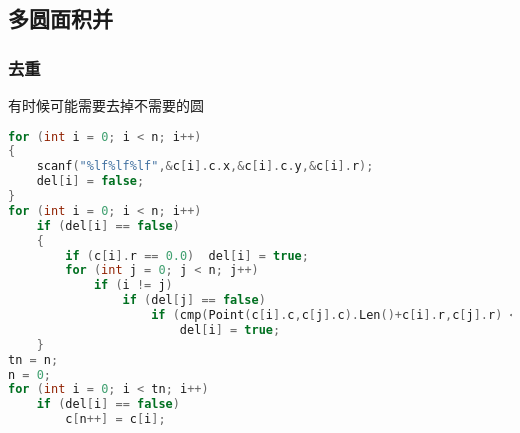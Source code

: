 \subsection{多圆面积并}
	\subsubsection{去重}
	有时候可能需要去掉不需要的圆
	\begin{lstlisting}[language=c++]
for (int i = 0; i < n; i++)
{
	scanf("%lf%lf%lf",&c[i].c.x,&c[i].c.y,&c[i].r);
	del[i] = false;
}
for (int i = 0; i < n; i++)
	if (del[i] == false)
	{
		if (c[i].r == 0.0)  del[i] = true;
		for (int j = 0; j < n; j++)
			if (i != j)
				if (del[j] == false)
					if (cmp(Point(c[i].c,c[j].c).Len()+c[i].r,c[j].r) <= 0)
						del[i] = true;
	}
tn = n;
n = 0;
for (int i = 0; i < tn; i++)
	if (del[i] == false)
		c[n++] = c[i];
	\end{lstlisting}
	
